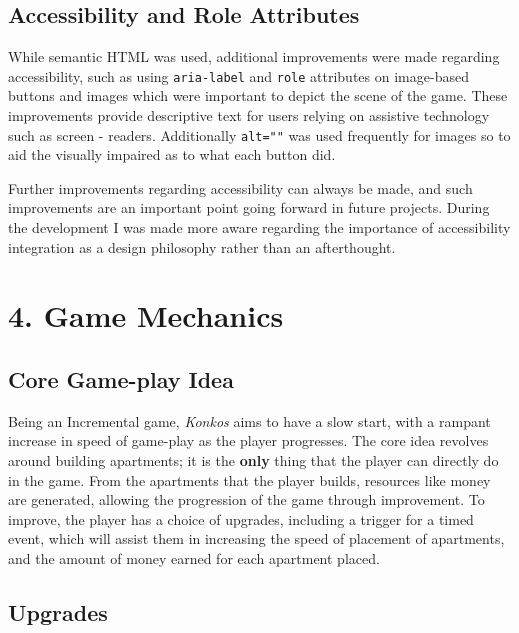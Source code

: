 \documentclass{article}
\begin{document}
\subsection*{Accessibility and Role Attributes}

While semantic HTML was used, additional improvements were made regarding accessibility, such as using \texttt{aria-label}  and \texttt{role} attributes on image-based buttons and images which were important to depict the scene of the game. These improvements provide descriptive text for users relying on assistive technology such as screen - readers. Additionally \texttt{alt=""} was  used frequently for images so to aid the visually impaired as to what each button did.

Further improvements regarding accessibility can always be made, and such improvements are an important point going forward in future projects. During the development I was made more aware regarding the importance of accessibility integration as a design philosophy rather than an afterthought. 

\section*{4. Game Mechanics}

\subsection*{Core Game-play Idea}

Being an Incremental game, \textit{Konkos} aims to have a slow start, with a rampant increase in speed of game-play as the player progresses. The core idea revolves around building apartments; it is the \textbf{only} thing that the player can directly do in the game. From the apartments that the player builds, resources like money are generated, allowing the progression of the game through improvement. To improve, the player has a choice of upgrades, including a trigger for a timed event, which will assist them in increasing the speed of placement of apartments, and the amount of money earned for each apartment placed.

\subsection*{Upgrades}
\end{document}
